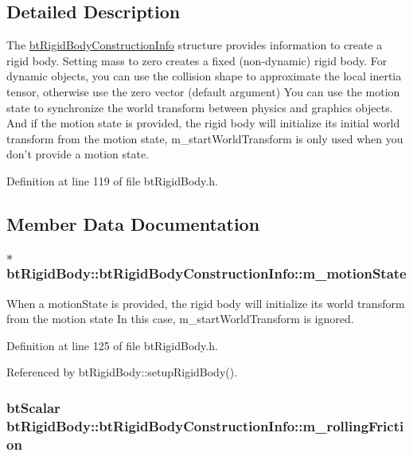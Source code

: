 \subsection{Detailed Description}
The \hyperlink{structbt_rigid_body_1_1bt_rigid_body_construction_info}{btRigidBodyConstructionInfo} structure provides information to create a rigid body. Setting mass to zero creates a fixed (non-dynamic) rigid body. For dynamic objects, you can use the collision shape to approximate the local inertia tensor, otherwise use the zero vector (default argument) You can use the motion state to synchronize the world transform between physics and graphics objects. And if the motion state is provided, the rigid body will initialize its initial world transform from the motion state, m\_\-startWorldTransform is only used when you don't provide a motion state. 

Definition at line 119 of file btRigidBody.h.

\subsection{Member Data Documentation}
\hypertarget{structbt_rigid_body_1_1bt_rigid_body_construction_info_729b0b79412f36ac983d4adafbffa429}{
\subsubsection[m\_\-motionState]{$\ast$ {\bf btRigidBody::btRigidBodyConstructionInfo::m\_\-motionState}}}
\label{structbt_rigid_body_1_1bt_rigid_body_construction_info_729b0b79412f36ac983d4adafbffa429}


When a motionState is provided, the rigid body will initialize its world transform from the motion state In this case, m\_\-startWorldTransform is ignored. 

Definition at line 125 of file btRigidBody.h.

Referenced by btRigidBody::setupRigidBody().\hypertarget{structbt_rigid_body_1_1bt_rigid_body_construction_info_bb72d0a00d035d2224a927810e9ed972}{
\subsubsection[m\_\-rollingFriction]{\setlength{\rightskip}{0pt plus 5cm}btScalar {\bf btRigidBody::btRigidBodyConstructionInfo::m\_\-rollingFriction}}}
\label{structbt_rigid_body_1_1bt_rigid_body_construction_info_bb72d0a00d035d2224a927810e9ed972}


